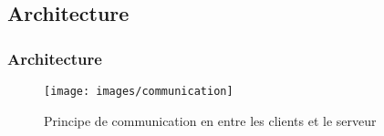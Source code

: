 \subsection{Architecture}
\begin{frame}[c]
	\frametitle{Architecture}
	\begin{center}
		\begin{figure}[h]
			\begin{center}
				\texttt{[image: images/communication]}
			\end{center}
			\caption{Principe de communication en entre les clients et le serveur}
			\label{fig:comm}
		\end{figure}
	\end{center}
\end{frame}
